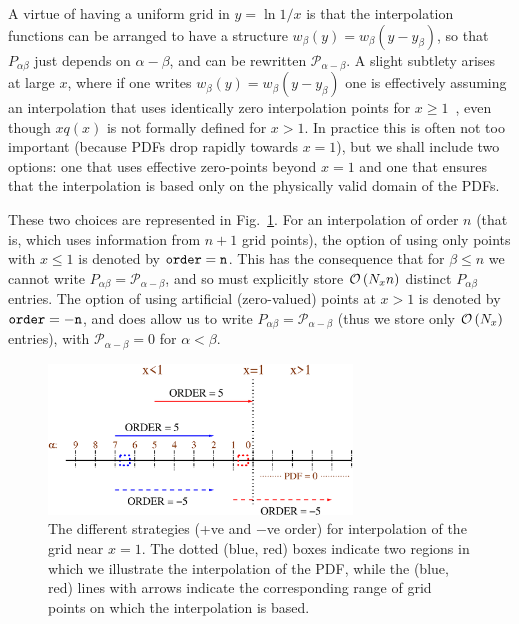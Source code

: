\documentclass[12pt]{article}
\newcommand{\order}[1]{{\cal O}\left(#1\right)}
\begin{document}
A virtue
 of having a uniform grid in $y = \ln 1/x$ is that the
interpolation functions can be arranged to have a structure
$w_\beta(y) = w_{\beta}(y - y_\beta)$, so that $P_{\alpha\beta}$ just depends
on $\alpha - \beta$, and can be rewritten $\mathcal{P}_{\alpha - \beta}$. A
slight subtlety arises at large $x$, where if one writes $w_\beta(y) =
w_{\beta}(y - y_\beta)$ one is effectively assuming an interpolation that uses
identically zero interpolation points for $x\ge 1$~\cite{coriano,
Ratcliffe:2000kp},
even though $xq(x)$ is not formally defined for $x > 1$. In practice
this is often not too important (because PDFs drop rapidly towards
$x=1$), but we shall include two options: one that uses effective
zero-points beyond $x=1$ and one that ensures that the interpolation
is based only on the physically valid domain of the PDFs.

These two choices are represented in
Fig.~\ref{fig:interpolation-orders}.  For an interpolation of order
$n$ (that is, which uses information from $n+1$ grid points), the
option of using only points with $x\le 1$ is denoted by $\tt order=n$.
This has the consequence that for $\beta \le n$ we cannot write
$P_{\alpha\beta} = \mathcal{P}_{\alpha-\beta}$, and so must explicitly
store $\order{N_x n}$ distinct $P_{\alpha\beta}$ entries.
%
The option of using artificial (zero-valued) points at $x>1$ is denoted by $\tt
order=-n$, and does allow us to write $P_{\alpha\beta} =
\mathcal{P}_{\alpha-\beta}$ (thus we store only $\order{N_x}$
entries), with $\mathcal{P}_{\alpha-\beta} = 0$ for $\alpha < \beta$.

\begin{figure}
  \centering
  \includegraphics[width=0.72\textwidth]{interpolation-order.eps}%
  \caption{The different strategies (+ve and $-$ve order) for
    interpolation of the grid near $x=1$. The dotted (blue, red) boxes
    indicate two regions in which we illustrate the interpolation of
    the PDF, while the (blue, red) lines with arrows indicate the
    corresponding range of grid points on which the interpolation is
    based.}
  \label{fig:interpolation-orders}
\end{figure}
\end{document}
